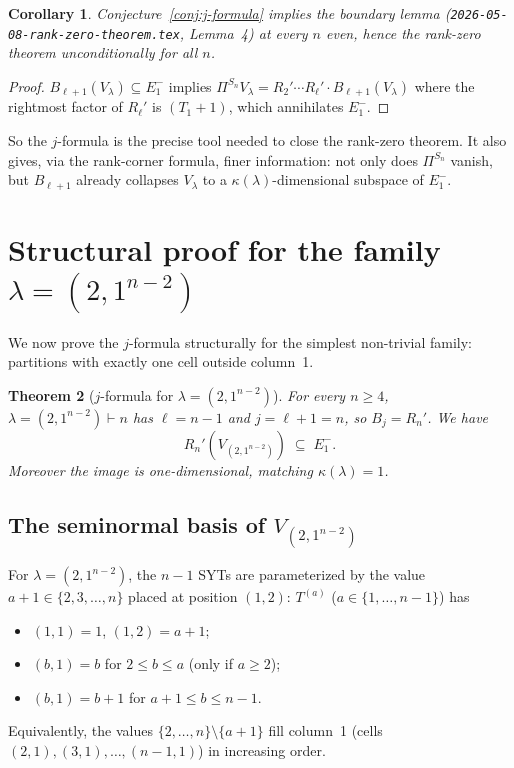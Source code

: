 \documentclass[11pt]{article}
\newtheorem{theorem}{Theorem}
\newtheorem{corollary}[theorem]{Corollary}
\theoremstyle{definition}
\begin{document}
\begin{corollary}\label{cor:boundary-from-j}
Conjecture~\ref{conj:j-formula} implies the boundary lemma
(\texttt{2026-05-08-rank-zero-theorem.tex}, Lemma~4) at every $n$
even, hence the rank-zero theorem unconditionally for all $n$.
\end{corollary}

\begin{proof}
$B_{\ell+1}(V_\lambda)\subseteq E_1^-$ implies $\Pi^{S_n}V_\lambda
=R_2'\cdots R_\ell'\cdot B_{\ell+1}(V_\lambda)$ where the rightmost
factor of $R_\ell'$ is $(T_1{+}1)$, which annihilates $E_1^-$.
\end{proof}

So the $j$-formula is the precise tool needed to close the rank-zero
theorem.  It also gives, via the rank-corner formula, finer
information: not only does $\Pi^{S_n}$ vanish, but $B_{\ell+1}$
already collapses $V_\lambda$ to a $\kappa(\lambda)$-dimensional
subspace of $E_1^-$.

\section{Structural proof for the family $\lambda=(2,1^{n-2})$}

We now prove the $j$-formula structurally for the simplest non-trivial
family: partitions with exactly one cell outside column~1.

\begin{theorem}[$j$-formula for $\lambda=(2,1^{n-2})$]\label{thm:two-one}
For every $n\ge 4$, $\lambda=(2,1^{n-2})\vdash n$ has $\ell=n-1$ and
$j=\ell+1=n$, so $B_j=R_n'$.  We have
\[
   R_n'(V_{(2,1^{n-2})}) \;\subseteq\; E_1^-.
\]
Moreover the image is one-dimensional, matching $\kappa(\lambda)=1$.
\end{theorem}

\subsection{The seminormal basis of $V_{(2,1^{n-2})}$}

For $\lambda=(2,1^{n-2})$, the $n-1$ SYTs are parameterized by the
value $a+1\in\{2,3,\ldots,n\}$ placed at position $(1,2)$:
$T^{(a)}$ ($a\in\{1,\ldots,n-1\}$) has
\begin{itemize}[leftmargin=2em,topsep=0.3em,itemsep=0.2em]
\item $(1,1)=1$, $(1,2)=a+1$;
\item $(b,1)=b$ for $2\le b\le a$ (only if $a\ge 2$);
\item $(b,1)=b+1$ for $a+1\le b \le n-1$.
\end{itemize}
Equivalently, the values $\{2,\ldots,n\}\setminus\{a+1\}$ fill column~1
(cells $(2,1),(3,1),\ldots,(n-1,1)$) in increasing order.
\end{document}
